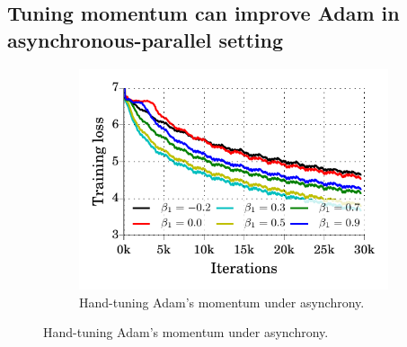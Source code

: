 \subsection{Tuning momentum can improve Adam in asynchronous-parallel setting}
\begin{figure}
\vspace{-4.5em}
\begin{minipage}{1.0\linewidth}
	\begin{figure}[H]
		\includegraphics[width=\linewidth]{experiment_results/ptb/adam_stale_15_tuning.pdf}
			\vspace{-1.5em}
		\caption{Hand-tuning Adam's momentum under asynchrony.}
		\label{fig:adam_async_mom}
	\end{figure}
\end{minipage}	
\end{figure}
